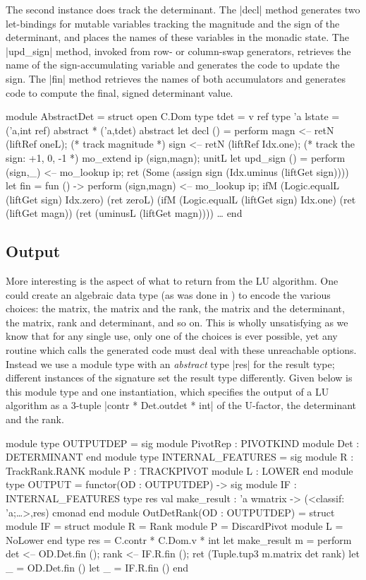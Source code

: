 \documentclass{elsart}
\begin{document}
The second instance does track the determinant. The |decl| method
generates two let-bindings for mutable variables tracking the
magnitude and the sign of the determinant, and places the names of
these variables in the monadic state. The |upd_sign| method, invoked
from row- or column-swap generators, retrieves the name of the
sign-accumulating variable and generates the code to update the
sign. The |fin| method retrieves the names of both accumulators and
generates code to compute the final, signed determinant value.
\begin{code}
module AbstractDet =
  struct
  open C.Dom
  type tdet = v ref
  type 'a lstate = ('a,int ref) abstract * ('a,tdet) abstract
  let decl () = perform
      magn <-- retN (liftRef oneL);    (* track magnitude *)
      sign <-- retN (liftRef Idx.one); (* track the sign: +1, 0, -1 *)
      mo_extend ip (sign,magn);
      unitL
  let upd_sign () = perform
      (sign,_) <-- mo_lookup ip;
      ret (Some (assign sign (Idx.uminus (liftGet sign))))
  let fin = fun () -> perform
      (sign,magn) <-- mo_lookup ip;
      ifM (Logic.equalL (liftGet sign) Idx.zero) (ret zeroL)
      (ifM (Logic.equalL (liftGet sign) Idx.one) (ret (liftGet magn))
          (ret (uminusL (liftGet magn))))
  \dots
end
\end{code}

\subsection{Output}

More interesting is the aspect of what to return
from the LU algorithm.  One could create an algebraic data type (as
was done in \cite{Carette06}) to encode the various choices: the
matrix, the matrix and the rank, the matrix and the determinant, the
matrix, rank and determinant, and so on. This is wholly unsatisfying
as we know that for any single use, only one of the choices is ever
possible, yet any routine which calls the generated code must deal
with these unreachable options.  Instead we use a module type with an
\emph{abstract} type |res| for the result type; different instances of
the signature set the result type differently. Given below is this
module type and one instantiation, which specifies the output of a LU
algorithm as a 3-tuple |contr * Det.outdet * int| of the U-factor, the
determinant and the rank.

\begin{code}
module type OUTPUTDEP = sig 
    module PivotRep : PIVOTKIND 
    module Det      : DETERMINANT
end
module type INTERNAL_FEATURES = sig
  module R      : TrackRank.RANK
  module P      : TRACKPIVOT
  module L      : LOWER
end
module type OUTPUT = functor(OD : OUTPUTDEP) -> sig
  module IF : INTERNAL_FEATURES
  type res
  val make_result : 'a wmatrix -> (<classif: 'a;\dots>,res) cmonad
end
module OutDetRank(OD : OUTPUTDEP) = struct
  module IF = struct
    module R   = Rank
    module P   = DiscardPivot
    module L   = NoLower end
  type res = C.contr * C.Dom.v * int
  let make_result m = perform
    det  <-- OD.Det.fin ();
    rank <-- IF.R.fin ();
    ret (Tuple.tup3 m.matrix det rank)
  let _ = OD.Det.fin ()
  let _ = IF.R.fin ()
end
\end{code}
\end{document}
